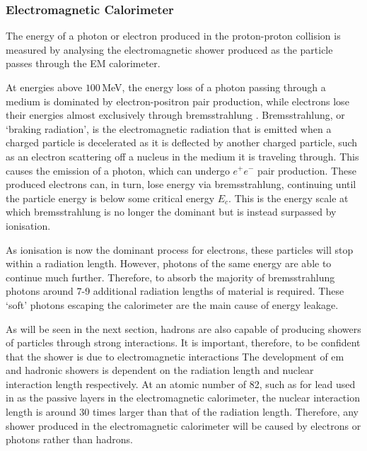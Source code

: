 \documentclass{article}
\begin{document}
\subsubsection{Electromagnetic Calorimeter}
\label{sec:ATLAS_DetectorSchematics_ECAL}

The energy of a photon or electron produced in the proton-proton collision is measured by analysing the electromagnetic shower produced as the particle passes through the EM calorimeter. 

At energies above $100\,$MeV, the energy loss of a photon passing through a medium is dominated by electron-positron pair production, while electrons lose their energies almost exclusively through bremsstrahlung \cite{RPP}. 
Bremsstrahlung, or `braking radiation', is the electromagnetic radiation that is emitted when a charged particle is decelerated as it is deflected by another charged particle, such as an electron scattering off a nucleus in the medium it is traveling through. This causes the emission of a photon, which can undergo $e^+e^-$ pair production. These produced electrons can, in turn, lose energy via bremsstrahlung, continuing until the particle energy is below some critical energy $E_c$. This is the energy scale at which bremsstrahlung is no longer the dominant but is instead surpassed by ionisation.

As ionisation is now the dominant process for electrons, these particles will stop within a radiation length. However, photons of the same energy are able to continue much further. Therefore, to absorb the majority of bremsstrahlung photons around 7-9 additional radiation lengths of material is required. These `soft' photons escaping the calorimeter are the main cause of energy leakage.

As will be seen in the next section, hadrons are also capable of producing showers of particles through strong interactions. It is important, therefore, to be confident that the shower is due to electromagnetic interactions
The development of em and hadronic showers is dependent on the radiation length and nuclear interaction length respectively. At an atomic number of 82, such as for lead used in as the passive layers in the electromagnetic calorimeter, the nuclear interaction length is around 30 times larger than that of the radiation length. Therefore, any shower produced in the electromagnetic calorimeter will be caused by electrons or photons rather than hadrons.
\end{document}

